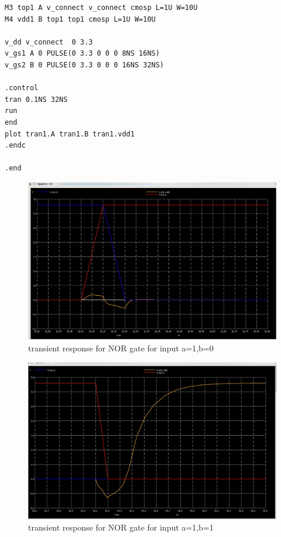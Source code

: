 \documentclass[12pt,a4paper]{article}
\begin{document}
\begin{center}
\begin{lstlisting}
M3 top1 A v_connect v_connect cmosp L=1U W=10U 
M4 vdd1 B top1 top1 cmosp L=1U W=10U

v_dd v_connect  0 3.3
v_gs1 A 0 PULSE(0 3.3 0 0 0 8NS 16NS)
v_gs2 B 0 PULSE(0 3.3 0 0 0 16NS 32NS)

.control
tran 0.1NS 32NS
run
end
plot tran1.A tran1.B tran1.vdd1 
.endc

.end
\end{lstlisting}

\begin{figure}[h]
\centering
\includegraphics[scale=.42]{NOR_Gate_10.jpeg}
\caption[Short]{transient response for NOR gate for input a=1,b=0 }
\end{figure}
\clearpage

\begin{figure}[h]
\centering
\includegraphics[scale=.5]{NOR_Gate_11.jpeg}
\caption[Short]{transient response for NOR gate for input a=1,b=1 }
\end{figure}


\end{center}
\end{document}
